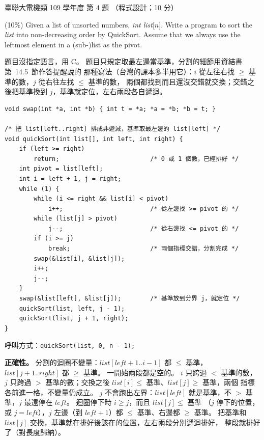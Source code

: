 \begin{pastexam}[label={px:ust-109-ee-ds-04}]{臺聯大電機類 109 學年度 第 4 題}
（程式設計；10 分）

(10\%) Given a list of unsorted numbers, \textit{int list}[$n$]. Write a program to sort the
\textit{list} into non-decreasing order by QuickSort. Assume that we always use the leftmost element
in a (sub-)list as the pivot.
\end{pastexam}

\begin{pastsoln}
題目沒指定語言，用 C。 題目只規定取最左邊當基準，分割的細節用資結書第~14.5~節作答提醒說的
那種寫法（台灣的課本多半用它）：$i$ 從左往右找 $\ge$ 基準的數，$j$ 從右往左找 $\le$ 基準的數，
兩個都找到而且還沒交錯就交換；交錯之後把基準換到 $j$，基準就定位，左右兩段各自遞迴。

\begin{verbatim}
void swap(int *a, int *b) { int t = *a; *a = *b; *b = t; }

/* 把 list[left..right] 排成非遞減，基準取最左邊的 list[left] */
void quickSort(int list[], int left, int right) {
    if (left >= right)
        return;                         /* 0 或 1 個數，已經排好 */
    int pivot = list[left];
    int i = left + 1, j = right;
    while (1) {
        while (i <= right && list[i] < pivot)
            i++;                        /* 從左邊找 >= pivot 的 */
        while (list[j] > pivot)
            j--;                        /* 從右邊找 <= pivot 的 */
        if (i >= j)
            break;                      /* 兩個指標交錯，分割完成 */
        swap(&list[i], &list[j]);
        i++;
        j--;
    }
    swap(&list[left], &list[j]);        /* 基準放到分界 j，就定位 */
    quickSort(list, left, j - 1);
    quickSort(list, j + 1, right);
}
\end{verbatim}
呼叫方式：\texttt{quickSort(list, 0, n - 1);}

\textbf{正確性。} 分割的迴圈不變量：$\mathit{list}[\mathit{left}+1 .. i-1]$ 都 $\le$ 基準，
$\mathit{list}[j+1 .. \mathit{right}]$ 都 $\ge$ 基準。 一開始兩段都是空的。 $i$ 只跨過 $<$ 基準的數，
$j$ 只跨過 $>$ 基準的數；交換之後 $\mathit{list}[i] \le$ 基準、$\mathit{list}[j] \ge$ 基準，兩個
指標各前進一格，不變量仍成立。 $j$ 不會跑出左界：$\mathit{list}[\mathit{left}]$ 就是基準，不
$>$ 基準，$j$ 最遠停在 $\mathit{left}$。 迴圈停下時 $i \ge j$，而且 $\mathit{list}[j] \le$ 基準
（$j$ 停下的位置，或 $j = \mathit{left}$），$j$ 左邊（到 $\mathit{left}+1$）都 $\le$ 基準、右邊都
$\ge$ 基準。 把基準和 $\mathit{list}[j]$ 交換，基準就在排好後該在的位置，左右兩段分別遞迴排好，
整段就排好了（對長度歸納）。


\end{pastsoln}
